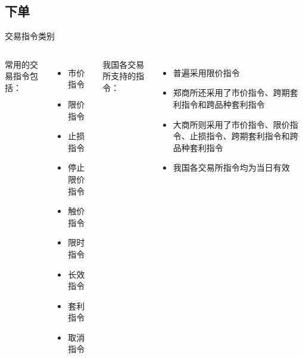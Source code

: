 \subsection{下单}

\begin{frame}{交易指令类别}
  \begin{columns}
    \column{5cm}
    常用的交易指令包括：
    \begin{itemize}
    \item 市价指令
    \item 限价指令
    \item 止损指令
    \item 停止限价指令
    \item 触价指令
    \item 限时指令
    \item 长效指令
    \item 套利指令
    \item 取消指令
    \end{itemize}
    \column{5cm}
    我国各交易所支持的指令：
    \begin{itemize}
    \item 普遍采用限价指令
    \item 郑商所还采用了市价指令、跨期套利指令和跨品种套利指令
    \item 大商所则采用了市价指令、限价指令、止损指令、跨期套利指令和跨品种套利指令
    \item 我国各交易所指令均为当日有效
    \end{itemize}
  \end{columns} 
\end{frame}

